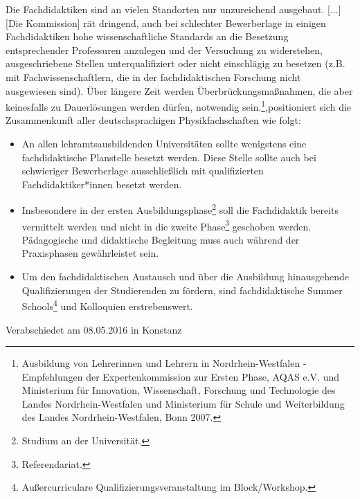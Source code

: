 \documentclass[DIV=calc]{scrartcl}
\begin{document}
\glqq Die Fachdidaktiken sind an vielen Standorten nur unzureichend ausgebaut. [...] [Die Kommission] rät dringend, auch bei schlechter Bewerberlage in einigen Fachdidaktiken hohe wissenschaftliche Standards an die Besetzung entsprechender Professuren anzulegen und der Versuchung zu widerstehen, ausgeschriebene Stellen unterqualifiziert oder nicht einschlägig zu besetzen (z.B. mit Fachwissenschaftlern, die in der fachdidaktischen Forschung nicht ausgewiesen sind). Über längere Zeit werden Überbrückungsmaßnahmen, die aber keinesfalls zu Dauerlösungen werden dürfen, notwendig sein.\grqq\footnote{Ausbildung von Lehrerinnen und Lehrern in
Nordrhein-Westfalen - Empfehlungen der Expertenkommission zur Ersten Phase, AQAS e.V. und Ministerium für Innovation, Wissenschaft, Forschung und Technologie des Landes Nordrhein-Westfalen und Ministerium für Schule und Weiterbildung des Landes Nordrhein-Westfalen, Bonn 2007.},positioniert sich die Zusammenkunft aller deutschsprachigen Physikfachschaften wie folgt:
\begin{itemize}
\item An allen lehramtsausbildenden Universitäten sollte wenigstens eine fachdidaktische Planstelle besetzt werden. Diese Stelle sollte auch bei schwieriger Bewerberlage ausschließlich mit qualifizierten Fachdidaktiker*innen besetzt werden.
\item Insbesondere in der ersten Ausbildungsphase\footnote{Studium an der Universität.} soll die Fachdidaktik bereits vermittelt werden und nicht in die zweite Phase\footnote{Referendariat.} geschoben werden. Pädagogische und didaktische Begleitung muss auch während der Praxisphasen gewährleistet sein.
\item Um den fachdidaktischen Austausch und über die Ausbildung hinausgehende Qualifizierungen der Studierenden zu fördern, sind fachdidaktische Summer Schools\footnote{Außercurriculare Qualifizierungsveranstaltung im Block/Workshop.} und Kolloquien erstrebenswert.
\end{itemize}

\vfill
\begin{flushright}
Verabschiedet am 08.05.2016 in Konstanz
\end{flushright}
\end{document}
